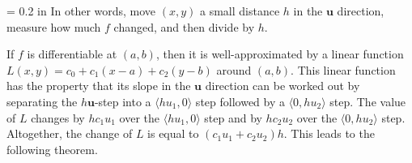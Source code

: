 \documentclass{watsonbook}
\begin{document}
\begin{minipage}[t]{0.6\textwidth} \parskip = 0.2 in
  In other words, move $(x,y)$ a small distance $h$ in the
  $\mathbf{u}$ direction, measure how much $f$ changed, and then
  divide by $h$.

  If $f$ is differentiable at $(a,b)$, then it is well-approximated
  by a linear function $L(x,y) = c_0 + c_1(x-a) + c_2(y-b)$ around
  $(a,b)$. This linear function has the property that its slope in
  the $\mathbf{u}$ direction can be worked out by separating the
  $h\mathbf{u}$-step into a $\langle hu_1, 0 \rangle$ step followed
  by a $\langle 0, hu_2 \rangle$ step. The value of $L$ changes by
  $hc_1u_1$ over the $\langle hu_1, 0 \rangle$ step and by
  $hc_2u_2$ over the $\langle 0, hu_2 \rangle$ step. Altogether, the
  change of $L$ is equal to $(c_1u_1 + c_2u_2 )h$. This
  leads to the following theorem.
\end{minipage}
\end{document}
